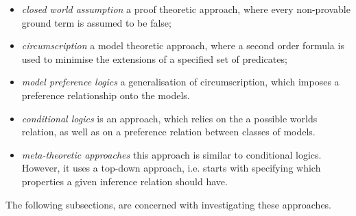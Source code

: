 \documentclass{article}
\begin{document}
\begin{itemize}


\item \emph{closed world assumption} a proof theoretic approach, where every non-provable ground term is assumed to be false;

\item \emph{circumscription} a model theoretic approach, where a second order formula is used to minimise the extensions of a specified set of predicates;

\item \emph{model preference logics} a generalisation of circumscription, which imposes a preference relationship onto the models.

\item \emph{conditional logics} is an approach, which relies on the a possible worlds relation, as well as on a preference relation between classes of models.

\item \emph{meta-theoretic approaches} this approach is similar to conditional logics. However, it uses a top-down approach, i.e. starts with specifying which properties a given inference relation should have.
\end{itemize}

The following subsections, are concerned with investigating these approaches.
\end{document}
